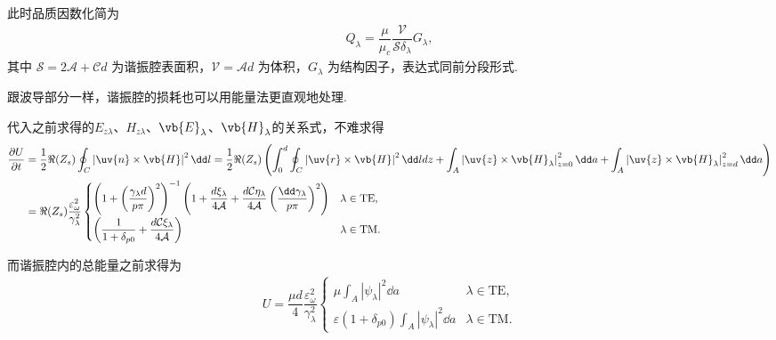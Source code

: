 此时品质因数化简为
\begin{align*}
	Q_{\lambda} = \dfrac{\mu}{\mu_c} \dfrac{\mathcal{V}}{\mathcal{S} \delta_{\lambda}} G_{\lambda},
\end{align*}
其中 \(\mathcal{S} = 2\mathcal{A} + \mathcal{C}d\) 为谐振腔表面积，\(\mathcal{V} = \mathcal{A}d\) 为体积，\(G_{\lambda}\) 为结构因子，表达式同前分段形式.
\begin{note}
	跟波导部分一样，谐振腔的损耗也可以用能量法更直观地处理.

	代入之前求得的\(E_{z\lambda}\)、\(H_{z\lambda}\)、\(\vb{E}_\lambda\)、\(\vb{H}_\lambda\)的关系式，不难求得
	\begin{align*}
		\dfrac{\partial U}{\partial t}& = \dfrac{1}{2} \Re(Z_s) \oint_C \left| \uv{n} \times \vb{H} \right|^2 \dd l = \dfrac{1}{2} \Re(Z_s) \left( \int_0^d \oint_C \left| \uv{r} \times \vb{H} \right|^2 \dd l dz + \int_A \left| \uv{z} \times \vb{H}_{\lambda} \right|_{z=0}^2 \dd a + \int_A \left| \uv{z} \times \vb{H}_{\lambda} \right|_{z=d}^2 \dd a \right) \\&= \Re(Z_s) \dfrac{\varepsilon_\omega^2}{\gamma_\lambda^2}
		\begin{cases}
			\left( 1 + \left( \dfrac{\gamma_\lambda d}{p\pi} \right)^2 \right)^{-1} \left( 1 + \dfrac{d \xi_\lambda}{4 \mathcal{A}} + \dfrac{d \mathcal{C} \eta_\lambda}{4 \mathcal{A}} \left( \dfrac{\dd \gamma_\lambda}{p\pi} \right)^2 \right) & \lambda \in \text{TE}, \\[10pt]
			\left( \dfrac{1}{1 + \delta_{p0}} + \dfrac{d \mathcal{C} \xi_\lambda}{4 \mathcal{A}} \right)                                                                                                                                         & \lambda \in \text{TM}.
		\end{cases}
	\end{align*}

	而谐振腔内的总能量之前求得为
	\begin{align*}
		U = \dfrac{\mu d}{4} \dfrac{\varepsilon_\omega^2}{\gamma_\lambda^2}
		\begin{cases}
			\mu \int_A |\psi_\lambda|^2 \dd a                                        & \lambda \in \text{TE}, \\[8pt]
			\varepsilon \left( 1 + \delta_{p0} \right) \int_A |\psi_\lambda|^2 \dd a & \lambda \in \text{TM}.
		\end{cases}
	\end{align*}


\end{note}
